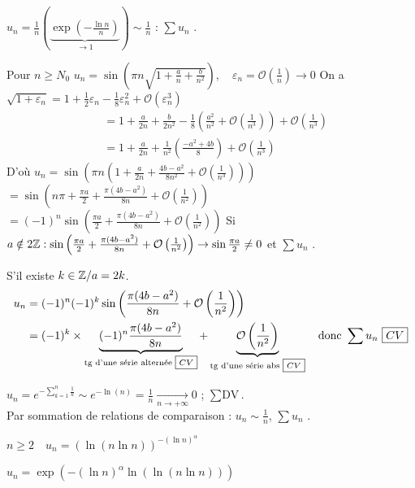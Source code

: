 \begin{solution}
$u_n = \frac{1}{n} \left( \underbrace{\exp\left(-\frac{\ln n}{n}\right)}_{\to 1} \right) \sim \frac{1}{n}$ : $\sum u_n$ .

Pour $n \geq N_0$
$u_n = \sin\left( \pi n \sqrt{1 + \frac{a}{n} + \frac{b}{n^2}} \right), \quad \varepsilon_n = \mathcal{O}\left(\frac{1}{n}\right) \to 0$
On a $\sqrt{1+\varepsilon_n} = 1 + \frac{1}{2}\varepsilon_n - \frac{1}{8}\varepsilon_n^2 + \mathcal{O}(\varepsilon_n^3)$
\begin{align*}
&= 1 + \frac{a}{2n} + \frac{b}{2n^2} - \frac{1}{8}\left( \frac{a^2}{n^2} + \mathcal{O}\left(\frac{1}{n^3}\right) \right) + \mathcal{O}\left(\frac{1}{n^3}\right) \\
&= 1 + \frac{a}{2n} + \frac{1}{n^2} \left( \frac{-a^2 + 4b}{8} \right) + \mathcal{O}\left(\frac{1}{n^3}\right)
\end{align*}
D'où $u_n = \sin\left( \pi n \left( 1 + \frac{a}{2n} + \frac{4b-a^2}{8n^2} + \mathcal{O}\left(\frac{1}{n^3}\right) \right) \right)$
$= \sin\left( n\pi + \frac{\pi a}{2} + \frac{\pi(4b-a^2)}{8n} + \mathcal{O}\left(\frac{1}{n^2}\right) \right)$
$= (-1)^n \sin\left( \frac{\pi a}{2} + \frac{\pi(4b-a^2)}{8n} + \mathcal{O}\left(\frac{1}{n^2}\right) \right)$
Si $a \notin 2\mathbb Z : \sin\left( \frac{\pi a}{2} + \frac{\pi(4b-a^2)}{8n} + \mathcal{O}\left(\frac{1}{n^2}\right) \right) \to \sin\frac{\pi a}{2} \neq 0$ et $\sum u_n$ .

S'il existe $k \in \mathbb Z / a = 2k$.
\begin{align*}
u_n &= (-1)^n (-1)^k \sin\left( \frac{\pi(4b-a^2)}{8n} + \mathcal{O}\left(\frac{1}{n^2}\right) \right) \\
&= (-1)^k \times \underbrace{(-1)^n \frac{\pi(4b-a^2)}{8n}}_{\text{tg d'une série alternée \boxed{CV}}} + \underbrace{\mathcal{O}\left(\frac{1}{n^2}\right)}_{\text{tg d'une série abs \boxed{CV}}} \quad \text{donc } \sum u_n \text{ \boxed{CV}}
\end{align*}

$u_n = e^{- \sum_{k=1}^n \frac{1}{k}} \sim e^{-\ln(n)} = \frac{1}{n} \xrightarrow[n \to +\infty]{} 0$ ; $\sum \text{DV}$.\\
Par sommation de relations de comparaison : $u_n \sim \frac{1}{n}$, $\sum u_n$ .

$n \geq 2 \quad u_n = (\ln(n \ln n))^{-(\ln n)^\alpha}$

$u_n = \exp\left( -(\ln n)^\alpha \ln(\ln(n \ln n)) \right)$


\end{solution}
